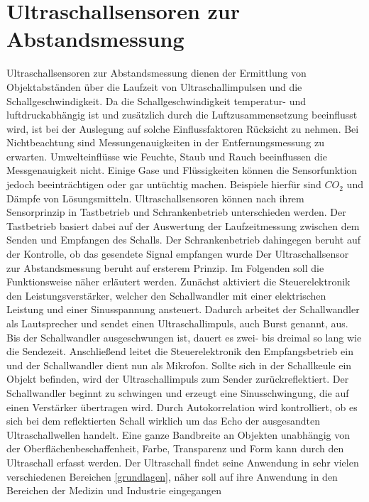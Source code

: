\section{Ultraschallsensoren zur Abstandsmessung}
Ultraschallsensoren zur Abstandsmessung dienen der Ermittlung von Objektabständen
über die Laufzeit von Ultraschallimpulsen und die Schallgeschwindigkeit. Da die
Schallgeschwindigkeit temperatur- und luftdruckabhängig ist und zusätzlich durch die
Luftzusammensetzung beeinflusst wird, ist bei der Auslegung auf solche
Einflussfaktoren Rücksicht zu nehmen. Bei Nichtbeachtung sind Messungenauigkeiten
in der Entfernungsmessung zu erwarten. \cite{Hesse:2009} Umwelteinflüsse wie Feuchte, Staub und
Rauch beeinflussen die Messgenauigkeit nicht. Einige Gase und Flüssigkeiten können
die Sensorfunktion jedoch beeinträchtigen oder gar untüchtig machen. Beispiele hierfür
sind $CO_2$ und Dämpfe von Lösungsmitteln. \cite{Hering:2012}
Ultraschallsensoren können nach ihrem Sensorprinzip in Tastbetrieb und
Schrankenbetrieb unterschieden werden. Der Tastbetrieb basiert dabei auf der
Auswertung der Laufzeitmessung zwischen dem Senden und Empfangen des Schalls.
Der Schrankenbetrieb dahingegen beruht auf der Kontrolle, ob das gesendete Signal
empfangen wurde \cite{Heinrich:2019} Der Ultraschallsensor zur Abstandsmessung beruht auf ersterem
Prinzip. Im Folgenden soll die Funktionsweise näher erläutert werden.
Zunächst aktiviert die Steuerelektronik den Leistungsverstärker, welcher den
Schallwandler mit einer elektrischen Leistung und einer Sinusspannung ansteuert.
Dadurch arbeitet der Schallwandler als Lautsprecher und sendet einen
Ultraschallimpuls, auch Burst genannt, aus. Bis der Schallwandler ausgeschwungen ist,
dauert es zwei- bis dreimal so lang wie die Sendezeit. Anschließend leitet die
Steuerelektronik den Empfangsbetrieb ein und der Schallwandler dient nun als
Mikrofon. Sollte sich in der Schallkeule ein Objekt befinden, wird der Ultraschallimpuls
zum Sender zurückreflektiert. Der Schallwandler beginnt zu schwingen und erzeugt eine
Sinusschwingung, die auf einen Verstärker übertragen wird. Durch Autokorrelation wird
kontrolliert, ob es sich bei dem reflektierten Schall wirklich um das Echo der
ausgesandten Ultraschallwellen handelt. \cite{Hesse:2009}
Eine ganze Bandbreite an Objekten unabhängig von der Oberflächenbeschaffenheit,
Farbe, Transparenz \cite{Hering:2012} und Form \cite{Hesse:2009} kann durch den Ultraschall erfasst werden.
Der Ultraschall findet seine Anwendung in sehr vielen verschiedenen Bereichen \ref{grundlagen},
näher soll auf ihre Anwendung in den Bereichen der Medizin und Industrie eingegangen
